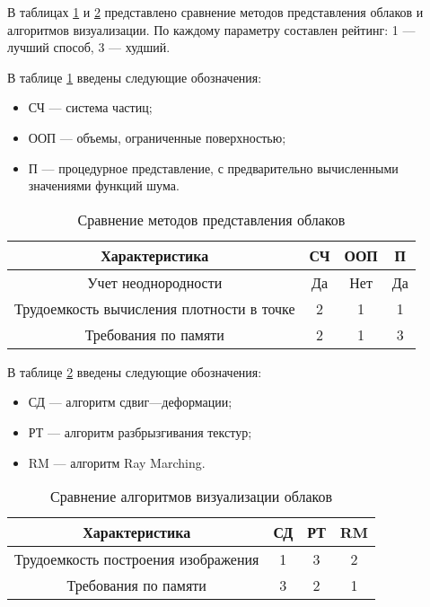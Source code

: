 В таблицах \ref{tbl:repr_choice} и \ref{tbl:rend_choice} представлено сравнение методов представления облаков и алгоритмов визуализации. По каждому параметру составлен рейтинг: 1 --- лучший способ, 3 --- худший.

В таблице \ref{tbl:repr_choice} введены следующие обозначения:
\begin{itemize}
	\item СЧ --- система частиц;
	\item ООП --- объемы, ограниченные поверхностью;
	\item П --- процедурное представление, с предварительно вычисленными значениями функций шума.
\end{itemize} 

\begin{table}[h]
	\begin{center}
		\begin{threeparttable}
			\captionsetup{justification=raggedright,singlelinecheck=off}
			\caption{Сравнение методов представления облаков}
			\label{tbl:repr_choice}
			\begin{tabular}{|c|c|c|c|}
				\hline
				Характеристика &  СЧ  & ООП & П \\
				\hline
				Учет неоднородности &  Да  & Нет & Да \\
				\hline
				Трудоемкость вычисления плотности в точке &  2  & 1 & 1 \\
				\hline
				Требования по памяти & 2 & 1 & 3 \\
				\hline
			\end{tabular}
		\end{threeparttable}
	\end{center}
\end{table}


В таблице \ref{tbl:rend_choice} введены следующие обозначения:
\begin{itemize}
	\item СД --- алгоритм сдвиг---деформации;
	\item РТ --- алгоритм разбрызгивания текстур;
	\item RM --- алгоритм Ray Marching.
\end{itemize} 

\begin{table}[h]
	\begin{center}
		\begin{threeparttable}
			\captionsetup{justification=raggedright,singlelinecheck=off}
			\caption{Сравнение алгоритмов визуализации облаков}
			\label{tbl:rend_choice}
			\begin{tabular}{|c|c|c|c|}
				\hline
				Характеристика &  СД  & РТ & RM \\
				\hline
				Трудоемкость построения изображения &  1  & 3 & 2 \\
				\hline
				Требования по памяти & 3 & 2 & 1 \\
				\hline
			\end{tabular}
		\end{threeparttable}
	\end{center}
\end{table}




